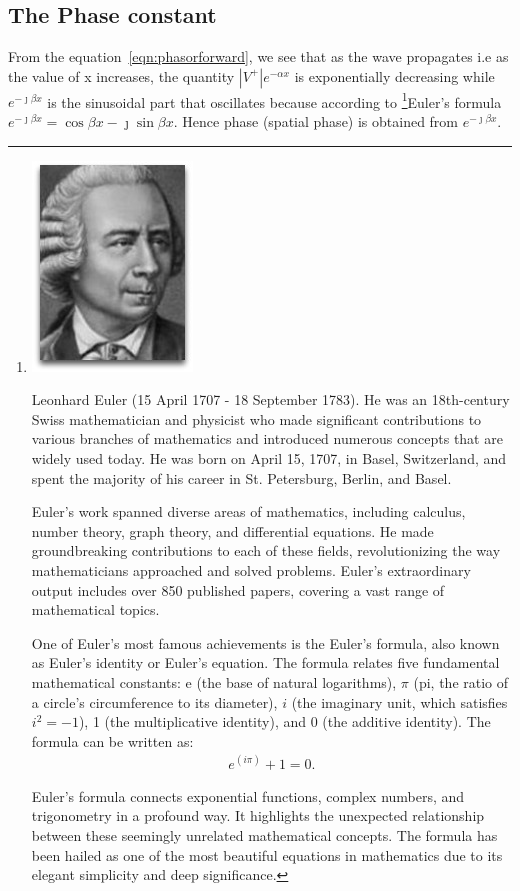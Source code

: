 \subsection{The Phase constant}
From the equation~\eqref{eqn:phasorforward}, we see that as the wave propagates i.e as the value of x increases, the quantity $\left|V^+\right|e^{-\alpha x}$ is exponentially decreasing while $e^{-\jmath\beta x}$ is the sinusoidal part that oscillates because according to \footnote{
\includegraphics[scale=0.2]{./graphics/euler}

Leonhard Euler (15 April 1707 - 18 September 1783). He was an 18th-century Swiss mathematician and physicist who made significant contributions to various branches of mathematics and introduced numerous concepts that are widely used today. He was born on April 15, 1707, in Basel, Switzerland, and spent the majority of his career in St. Petersburg, Berlin, and Basel.

Euler's work spanned diverse areas of mathematics, including calculus, number theory, graph theory, and differential equations. He made groundbreaking contributions to each of these fields, revolutionizing the way mathematicians approached and solved problems. Euler's extraordinary output includes over 850 published papers, covering a vast range of mathematical topics.

One of Euler's most famous achievements is the Euler's formula, also known as Euler's identity or Euler's equation. The formula relates five fundamental mathematical constants: e (the base of natural logarithms), $\pi$ (pi, the ratio of a circle's circumference to its diameter), $i$ (the imaginary unit, which satisfies $i^2 = -1$), 1 (the multiplicative identity), and 0 (the additive identity). The formula can be written as:
\begin{align*}
e^(i\pi) + 1 = 0.
\end{align*}

Euler's formula connects exponential functions, complex numbers, and trigonometry in a profound way. It highlights the unexpected relationship between these seemingly unrelated mathematical concepts. The formula has been hailed as one of the most beautiful equations in mathematics due to its elegant simplicity and deep significance.
}Euler's formula $e^{-\jmath\beta x} = \cos{\beta x} - \jmath \sin{ \beta x}$. Hence phase (spatial phase) is obtained from $e^{-\jmath\beta x}$.

